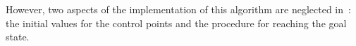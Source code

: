 \documentclass[eprint]{actapoly}
\begin{document}
%
%
%
%

\mbox{}

However, two aspects of the implementation of this algorithm are neglected 
in~\cite{Defoort2007a}: the initial values for
the control points and the procedure for reaching the goal state.

%
%



\end{document}
